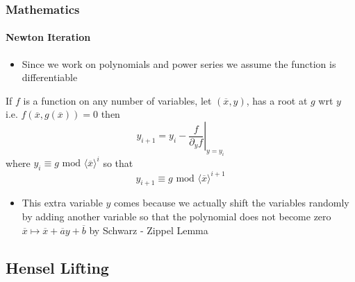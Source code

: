 \documentclass[10pt]{beamer}
\begin{document}
\begin{frame}
	\frametitle{Mathematics}
 \framesubtitle{Newton Iteration}
	
 \begin{itemize}
     \item Since we work on polynomials and  power series we assume the function is differentiable
     \end{itemize} 
 
	\begin{theorem}
		If $f$ is a function on any number of variables, let $(\overline{x},y)$, has a root at $g$ wrt $y$ i.e. $f(\overline{x},g(\overline{x}))=0$ then $$y_{i+1}=y_i-\left.\frac{f}{\partial_yf}\right|_{y=y_i} $$ where $y_i\equiv g\text{ mod } \langle \overline{x}\rangle^{i}$ so that $$y_{i+1}\equiv g\text{ mod }\langle \overline{x}\rangle^{i+1}$$
	\end{theorem}

 \begin{itemize}
     \item This extra variable $y$ comes because we actually shift the variables randomly by adding another variable so that the polynomial does not become zero $\overline{x}\mapsto \overline{x}+\overline{a}y+\overline{b}$  by Schwarz - Zippel Lemma \cite{schwarzippel}
          \end{itemize} 
\end{frame}


\subsection{Hensel Lifting}
\end{document}
